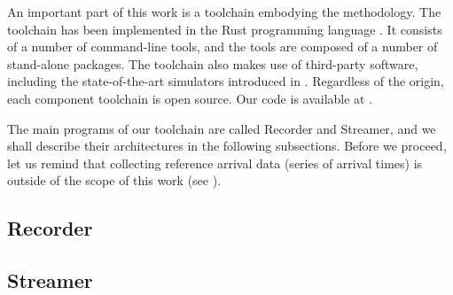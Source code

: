 An important part of this work is a toolchain embodying the methodology. The
toolchain has been implemented in the Rust programming language \cite{rust}. It
consists of a number of command-line tools, and the tools are composed of a
number of stand-alone packages. The toolchain also makes use of third-party
software, including the state-of-the-art simulators introduced in
. Regardless of the origin, each component toolchain is open
source. Our code is available at \cite{sources}.

The main programs of our toolchain are called Recorder and Streamer, and we
shall describe their architectures in the following subsections. Before we
proceed, let us remind that collecting reference arrival data (series of arrival
times) is outside of the scope of this work (see ).

\subsection{Recorder} 


\subsection{Streamer} 

